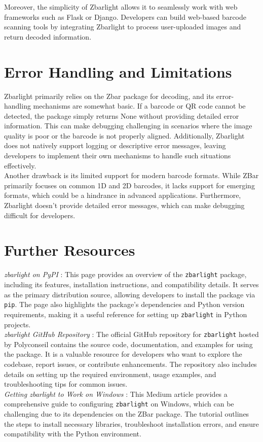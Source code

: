 Moreover, the simplicity of Zbarlight allows it to seamlessly work with web frameworks such as Flask or Django. Developers can build web-based barcode scanning tools by integrating Zbarlight to process user-uploaded images and return decoded information. \\

\section{Error Handling and Limitations}
Zbarlight primarily relies on the Zbar package for decoding, and its error-handling mechanisms are somewhat basic. If a barcode or QR code cannot be detected, the package simply returns None without providing detailed error information. This can make debugging challenging in scenarios where the image quality is poor or the barcode is not properly aligned. Additionally, Zbarlight does not natively support logging or descriptive error messages, leaving developers to implement their own mechanisms to handle such situations effectively. \cite{zbarlightgithub:2024}\\

Another drawback is its limited support for modern barcode formats. While ZBar primarily focuses on common 1D and 2D barcodes, it lacks support for emerging formats, which could be a hindrance in advanced applications. Furthermore, Zbarlight doesn’t provide detailed error messages, which can make debugging difficult for developers.\\

\section{Further Resources}

\textit{zbarlight on PyPI} \cite{zbarlightpypi:2024}: This page provides an overview of the \texttt{zbarlight} package, including its features, installation instructions, and compatibility details. It serves as the primary distribution source, allowing developers to install the package via \texttt{pip}. The page also highlights the package's dependencies and Python version requirements, making it a useful reference for setting up \texttt{zbarlight} in Python projects.\\

\textit{zbarlight GitHub Repository} \cite{zbarlightgithub:2024}: The official GitHub repository for \texttt{zbarlight} hosted by Polyconseil contains the source code, documentation, and examples for using the package. It is a valuable resource for developers who want to explore the codebase, report issues, or contribute enhancements. The repository also includes details on setting up the required environment, usage examples, and troubleshooting tips for common issues.\\

\textit{Getting zbarlight to Work on Windows} \cite{Dhambarage:2020}: This Medium article provides a comprehensive guide to configuring \texttt{zbarlight} on Windows, which can be challenging due to its dependencies on the ZBar package. The tutorial outlines the steps to install necessary libraries, troubleshoot installation errors, and ensure compatibility with the Python environment.\\
